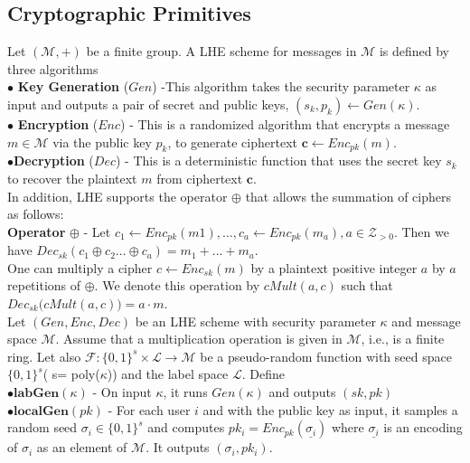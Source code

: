 \subsection{Cryptographic Primitives}
Let $(\mathcal{M}, +)$ be a finite group. A \textsf{LHE} scheme
for messages in $\mathcal{M}$ is defined  by three algorithms \\
$\bullet$ \textbf{Key Generation }($Gen$) -This  algorithm takes the security parameter $\kappa$ as input and outputs
a pair of secret and public keys, $(s_k, p_k) \leftarrow Gen(\kappa)$.\\
$\bullet$ \textbf{Encryption} ($Enc$) - This is a randomized algorithm that encrypts a message $m \in \mathcal{M}$ via the public key $p_k$, to generate ciphertext $\mathbf{c} \leftarrow Enc_{pk}(m)$.\\
$\bullet$\textbf{Decryption} ($Dec$) - This is a deterministic function that uses the secret key $s_k$ to
recover the plaintext $m$ from ciphertext $\mathbf{c}$.
\\
In addition, \textsf{LHE} supports the operator $\oplus$ that allows the summation of ciphers as follows:
\\ \textbf{Operator} $\oplus$ - Let $c_1 \leftarrow Enc_{pk}(m1), \ldots, c_a \leftarrow Enc_{pk}(m_a), a \in \mathcal{Z}_{>0}$. Then we have  $Dec_{sk}(c_1\oplus c_2 ...\oplus c_a)=    m_1 + \ldots   + m_a$.  \\
One can multiply a cipher $c\leftarrow  Enc_{sk}(m)$ by a plaintext positive integer $a$ by $a$ repetitions of $\oplus$. We denote this operation by $cMult(a,c)$ such that $Dec_{sk}\big(cMult(a,c)\big)=a\cdot m$.\\
Let $(Gen,Enc,Dec)$ be an \textsf{LHE} scheme with security parameter $\kappa$ and message space $\mathcal{M}$. Assume that a multiplication operation is given in $\mathcal{M}$, i.e., is a finite ring. Let also $\mathcal{F}:\{0,1\}^s \times \mathcal{L}\rightarrow \mathcal{M}$ be a pseudo-random function with seed space $\{0,1\}^s$( s= poly($\kappa $)) and the label space $\mathcal{L}$. Define
\\
 $\bullet \textbf{labGen}(\kappa)$ - On input $\kappa$, it runs $Gen(\kappa)$ and outputs $(sk,pk)$
\\$\bullet \textbf{localGen}(pk)$ -  For each user $i$ and with the public key as input, it samples a random seed $\sigma_i \in \{0,1\}^s$ and computes $pk_i = Enc_{pk}(\underline{\sigma_i})$ where $\underline{\sigma_i}$ is an  encoding of $\sigma_i$ as an  element of $\mathcal{M}$. It outputs $(\sigma_i,pk_i)$.\\
